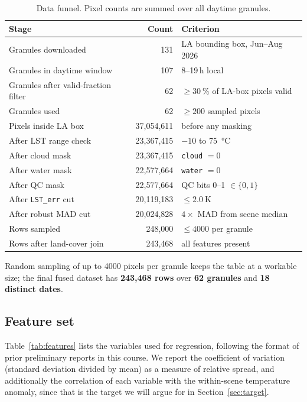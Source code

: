 \documentclass[10pt]{article}   %
\begin{document}
\begin{table}[H]
\centering
\caption{Data funnel. Pixel counts are summed over all daytime granules.}
\label{tab:funnel}
\small
\begin{tabular}{lrl}
\toprule
Stage & Count & Criterion \\
\midrule
Granules downloaded                  & 131 & LA bounding box, Jun--Aug 2026 \\
Granules in daytime window           & 107 & 8--19\,h local \\
Granules after valid-fraction filter & 62  & $\geq \SI{30}{\percent}$ of LA-box pixels valid \\
Granules used                        & 62  & $\geq 200$ sampled pixels \\
\midrule
Pixels inside LA box        & 37{,}054{,}611 & before any masking \\
After LST range check       & 23{,}367{,}415 & $-10$ to \SI{75}{\celsius} \\
After cloud mask            & 23{,}367{,}415 & \texttt{cloud} $= 0$ \\
After water mask            & 22{,}577{,}664 & \texttt{water} $= 0$ \\
After QC mask               & 22{,}577{,}664 & QC bits 0--1 $\in \{0,1\}$ \\
After \texttt{LST\_err} cut & 20{,}119{,}183 & $\leq \SI{2.0}{\kelvin}$ \\
After robust MAD cut        & 20{,}024{,}828 & $4 \times$ MAD from scene median \\
\midrule
Rows sampled                   & 248{,}000 & $\leq 4000$ per granule \\
Rows after land-cover join     & 243{,}468 & all features present \\
\bottomrule
\end{tabular}
\end{table}

Random sampling of up to 4000 pixels per granule keeps the table at a workable size; the
final fused dataset has \textbf{243{,}468 rows} over \textbf{62 granules} and
\textbf{18 distinct dates}.

\subsection{Feature set}
Table~\ref{tab:features} lists the variables used for regression, following the format of
prior preliminary reports in this course. We report the coefficient of variation
(standard deviation divided by mean) as a measure of relative spread, and additionally the
correlation of each variable with the within-scene temperature anomaly, since that is the
target we will argue for in Section~\ref{sec:target}.
\end{document}
